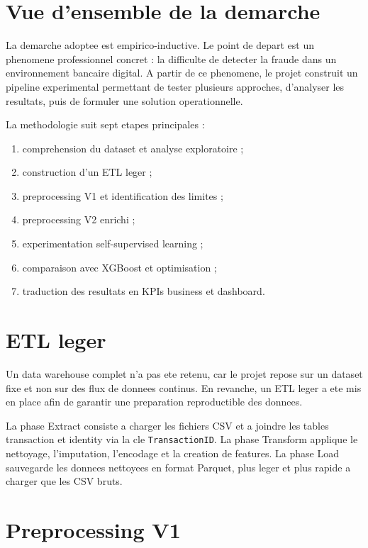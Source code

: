 ﻿\documentclass[12pt,a4paper,oneside]{report}
\begin{document}
\section{Vue d'ensemble de la demarche}

La demarche adoptee est empirico-inductive. Le point de depart est un phenomene professionnel concret : la difficulte de detecter la fraude dans un environnement bancaire digital. A partir de ce phenomene, le projet construit un pipeline experimental permettant de tester plusieurs approches, d'analyser les resultats, puis de formuler une solution operationnelle.

La methodologie suit sept etapes principales :

\begin{enumerate}
    \item comprehension du dataset et analyse exploratoire ;
    \item construction d'un ETL leger ;
    \item preprocessing V1 et identification des limites ;
    \item preprocessing V2 enrichi ;
    \item experimentation self-supervised learning ;
    \item comparaison avec XGBoost et optimisation ;
    \item traduction des resultats en KPIs business et dashboard.
\end{enumerate}

\section{ETL leger}

Un data warehouse complet n'a pas ete retenu, car le projet repose sur un dataset fixe et non sur des flux de donnees continus. En revanche, un ETL leger a ete mis en place afin de garantir une preparation reproductible des donnees.

La phase Extract consiste a charger les fichiers CSV et a joindre les tables transaction et identity via la cle \texttt{TransactionID}. La phase Transform applique le nettoyage, l'imputation, l'encodage et la creation de features. La phase Load sauvegarde les donnees nettoyees en format Parquet, plus leger et plus rapide a charger que les CSV bruts.

\section{Preprocessing V1}
\end{document}
